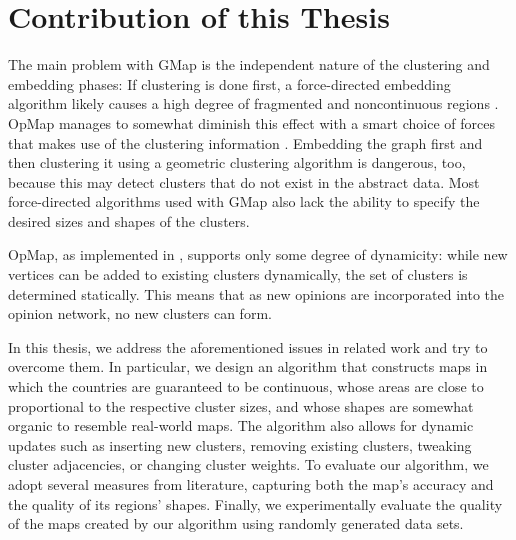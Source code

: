\section{Contribution of this Thesis}
\label{sect:structure-of-this-thesis}

The main problem with GMap is the independent nature of the clustering and embedding phases:
If clustering is done first, a force-directed embedding algorithm likely causes a high degree of fragmented and noncontinuous regions \cite{mashima2011visualizing}.
OpMap manages to somewhat diminish this effect with a smart choice of forces that makes use of the clustering information \cite{schmettow2017}.
Embedding the graph first and then clustering it using a geometric clustering algorithm is dangerous, too, because this may detect clusters that do not exist in the abstract data.
Most force-directed algorithms used with GMap also lack the ability to specify the desired sizes and shapes of the clusters.

OpMap, as implemented in \cite{schmettow2017}, supports only some degree of dynamicity: while new vertices can be added to existing clusters dynamically, the set of clusters is determined statically.
This means that as new opinions are incorporated into the opinion network, no new clusters can form.

In this thesis, we address the aforementioned issues in related work and try to overcome them.
In particular, we design an algorithm that constructs maps in which the countries are guaranteed to be continuous, whose areas are close to proportional to the respective cluster sizes, and whose shapes are somewhat organic to resemble real-world maps.
The algorithm also allows for dynamic updates such as inserting new clusters, removing existing clusters, tweaking cluster adjacencies, or changing cluster weights.
To evaluate our algorithm, we adopt several measures from literature, capturing both the map's accuracy and the quality of its regions' shapes.
Finally, we experimentally evaluate the quality of the maps created by our algorithm using randomly generated data sets.
